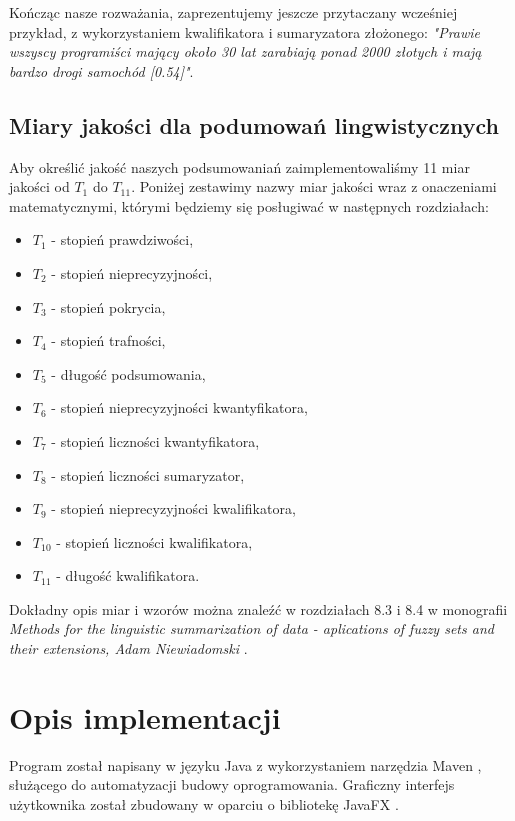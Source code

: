 \documentclass{classrep}
\begin{document}
Kończąc nasze rozważania, zaprezentujemy jeszcze przytaczany wcześniej przykład, z wykorzystaniem kwalifikatora i sumaryzatora złożonego: \textit{"Prawie wszyscy programiści mający około 30 lat zarabiają ponad 2000 złotych i mają bardzo drogi samochód [0.54]"}.


\subsection{Miary jakości dla podumowań lingwistycznych}

Aby określić jakość naszych podsumowaniań zaimplementowaliśmy 11 miar jakości od $T_1$ do $T_{11}$. Poniżej zestawimy nazwy miar jakości wraz z onaczeniami matematycznymi, którymi będziemy się posługiwać w następnych rozdziałach:

\begin{itemize}[label=$\bullet$\scshape\bfseries]
\item $T_1$ - stopień prawdziwości,
\item $T_2$ - stopień nieprecyzyjności,
\item $T_3$ - stopień pokrycia,
\item $T_4$ - stopień trafności,
\item $T_5$ - długość podsumowania,
\item $T_6$ - stopień nieprecyzyjności kwantyfikatora,
\item $T_7$ - stopień liczności kwantyfikatora,
\item $T_8$ - stopień liczności sumaryzator,
\item $T_9$ - stopień nieprecyzyjności kwalifikatora,
\item $T_{10}$ - stopień liczności kwalifikatora,
\item $T_{11}$ - długość kwalifikatora.
\end{itemize}

Dokładny opis miar i wzorów można znaleźć w rozdziałach 8.3 i 8.4 w monografii \textit{Methods for the linguistic summarization of data - aplications of fuzzy sets and their extensions, Adam Niewiadomski} \cite{ksiazka}.

\clearpage



\section{Opis implementacji}

Program został napisany w języku Java z wykorzystaniem narzędzia Maven \cite{Maven}, służącego do automatyzacji budowy oprogramowania. Graficzny interfejs użytkownika został zbudowany w oparciu o bibliotekę JavaFX \cite{FX}.\newline
\end{document}
